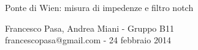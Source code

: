 \documentclass[11pt, twoside, a4paper]{article}
\begin{document}
\begin{center}

        {\huge Ponte di Wien: misura di impedenze e filtro notch}
    \vspace{0.1cm}

      	{Francesco Pasa, Andrea Miani - Gruppo B11} \\
      	{francescopasa@gmail.com - 24 febbraio 2014}
    \vspace{-0.2cm}

\end{center}





\end{document}
